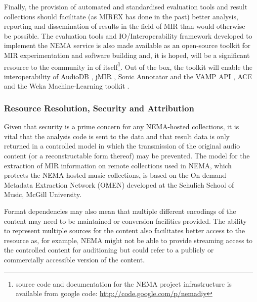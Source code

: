 \documentclass[conference]{IEEEtran}
\begin{document}
Finally, the provision of automated and standardised evaluation tools and result collections should facilitate (as MIREX has done in the past) better analysis, reporting and dissemination of results in the field of MIR than would otherwise be possible.
The evaluation tools and IO/Interoperability framework developed to implement the NEMA service is also made available as an open-source toolkit for MIR experimentation and software building and, it is hoped, will be a significant resource to the community in of itself\footnote{source code and documentation for the NEMA project infrastructure is available from google code: \url{http://code.google.com/p/nemadiy}}. 
Out of the box, the toolkit will enable the interoperability of AudioDB \cite{casey2008audiodb}, jMIR \cite{mckay2009jmir}, Sonic Annotator and the VAMP API \cite{cannam2006sonic}, ACE \cite{mckay2005ace} and the Weka Machine-Learning toolkit \cite{witten1999wpm}.  


\subsubsection{Resource Resolution, Security and Attribution}
Given that security is a prime concern for any NEMA-hosted collections, it is vital that the analysis code is sent to the data and that result data is only returned in a controlled model in which the transmission of the original audio content (or a reconstructable form thereof) may be prevented.
The model for the extraction of MIR information on remote collections used in NEMA, which protects the NEMA-hosted music collections, is based on the On-demand Metadata Extraction Network (OMEN) \cite{mcennis2006overview} developed at the Schulich School of Music, McGill University.

Format dependencies may also mean that multiple different encodings of the content may need to be maintained or conversion facilities provided. The ability to represent multiple sources for the content also facilitates better access to the resource as, for example, NEMA might not be able to provide streaming access to the controlled content for auditioning but could refer to a publicly or commercially accessible version of the content. \\
\end{document}
